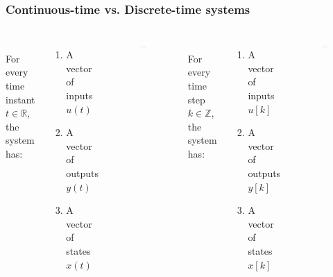 \begin{frame}
	\frametitle{Continuous-time vs. Discrete-time systems}
	\vspace{-2ex}
	\begin{columns}[c] 
		
		\\
		For every time instant $t \in \mathds{R}$, the system has: 
		\begin{enumerate}
			\item A vector of inputs $u(t)$
			\item A vector of outputs $y(t)$
			\item A vector of states $x(t)$
		\end{enumerate}
		\begin{figure}
			\includegraphics[width=0.8\linewidth]{continuous}
		\end{figure}
		
		\\
		For every time step $k \in \mathds{Z}$, the system has: 
		\begin{enumerate}
			\item A vector of inputs $u[k]$
			\item A vector of outputs $y[k]$
			\item A vector of states $x[k]$
		\end{enumerate}
		\begin{figure}
			\includegraphics[width=0.8\linewidth]{discrete}
		\end{figure}
		
	\end{columns}
\end{frame}

